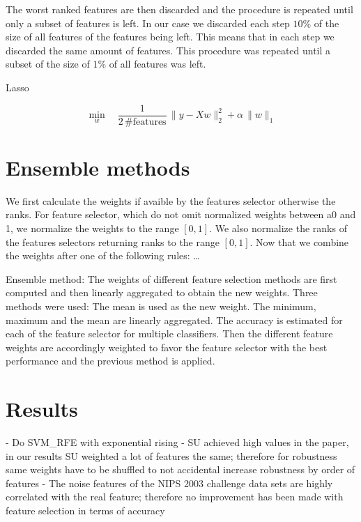 \documentclass[twoside,11pt]{article}
\begin{document}
The worst ranked features are then discarded and the procedure is repeated until only a subset of features is left.
In our case we discarded each step $10\%$ of the size of all features of the features being left. This means that
in each step we discarded the same amount of features. This procedure was repeated until a subset of the size
of $1\%$ of all features was left.

Lasso

\begin{equation}
  \min_w \quad \frac1{2 \, \textrm{\#features}} \, \|y - Xw\|^2_2 + \alpha \, \|w\|_1
\end{equation}


\section{Ensemble methods}
We first calculate the weights if avaible by the features selector otherwise the ranks.
For feature selector, which do not omit normalized weights between a0 and 1, we normalize
the weights to the range $[0,1]$. We also normalize the ranks of the features selectors returning
ranks to the range $[0,1]$. Now that we combine the weights after one of the following rules: \ldots

Ensemble method: The weights of different feature selection methods are first computed and then linearly aggregated to obtain the new weights. Three methods were used:
The mean is used as the new weight.
The minimum, maximum and the mean are linearly aggregated.
The accuracy is estimated for each of the feature selector for multiple classifiers. Then the different feature weights are accordingly weighted to favor the feature selector with the best performance and the previous method is applied.


\section{Results}
- Do SVM\_RFE with exponential rising
- SU achieved high values in the paper, in our results SU weighted a lot of features the 
same; therefore for robustness same weights have to be shuffled to not accidental increase
robustness by order of features
- The noise features of the NIPS 2003 challenge data sets are highly correlated with the
real feature; therefore no improvement has been made with feature selection in terms of 
accuracy

\end{document}
